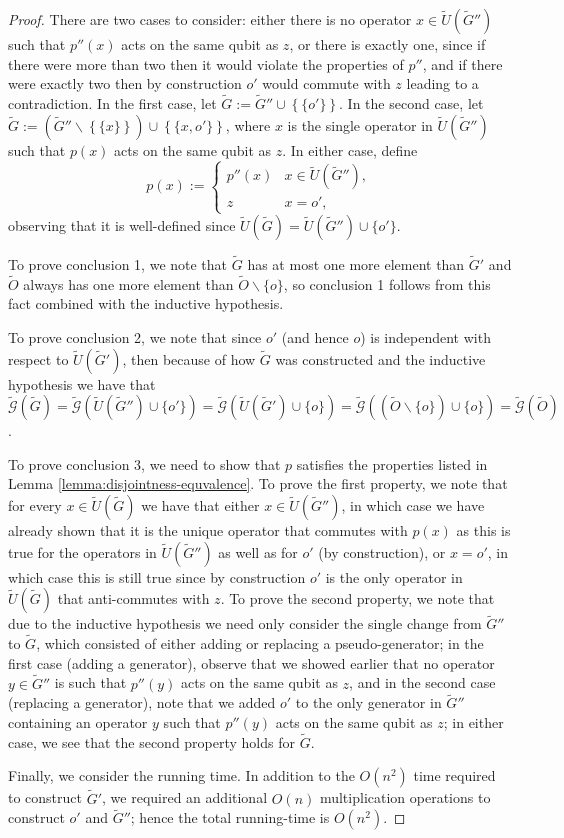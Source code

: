\documentclass{amsbook}
\theoremstyle{plain}
\theoremstyle{definition}
\theoremstyle{remark}
\newcommand{\set}{\tilde}
\newcommand{\genfun}{\tilde{\mathcal{G}}}
\newcommand{\paren}[1]{\left(#1\right)}
\begin{document}
\begin{proof}
There are two cases to consider:  either there is no operator $x\in\set U(\set G'')$ such that $p''(x)$ acts on the same qubit as $z$, or there is exactly one, since if there were more than two then it would violate the properties of $p''$, and if there were exactly two then by construction $o'$ would commute with $z$ leading to a contradiction.  In the first case, let $\set G:=\set G''\cup\left\{\{o'\}\right\}$.  In the second case, let $\set G:=\paren{\set G''\backslash\left\{\{x\}\right\}}\cup\left\{\{x,o'\}\right\}$, where $x$ is the single operator in $\set U(\set G'')$ such that $p(x)$ acts on the same qubit as $z$.   In either case, define
$$
p(x) :=
\begin{cases}
p''(x) & x\in \set U(\set G''), \\
z & x=o',
\end{cases}
$$
observing that it is well-defined since $\set U(\set G)=\set U(\set G'')\cup\{o'\}$.

To prove conclusion 1, we note that $\set G$ has at most one more element than $\set G'$ and $\set O$ always has one more element than $\set O\backslash\{o\}$, so conclusion 1 follows from this fact combined with the inductive hypothesis.

To prove conclusion 2, we note that since $o'$ (and hence $o$) is independent with respect to $\set U(\set G')$, then because of how $\set G$ was constructed and the inductive hypothesis we have that $\genfun(\set G)=\genfun\paren{\set U(\set G'')\cup\{o'\}}=\genfun\paren{\set U(\set G')\cup\{o\}}=\genfun\paren{(\set O\backslash\{o\})\cup\{o\}}=\genfun(\set O)$.

To prove conclusion 3, we need to show that $p$ satisfies the properties listed in Lemma \ref{lemma:disjointness-equvalence}.  To prove the first property, we note that for every $x\in\set U(\set G)$ we have that either $x\in\set U(\set G'')$, in which case we have already shown that it is the unique operator that commutes with $p(x)$ as this is true for the operators in $\set U(\set G'')$ as well as for $o'$ (by construction), or $x=o'$, in which case this is still true since by construction $o'$ is the only operator in $\set U(\set G)$ that anti-commutes with $z$.  To prove the second property, we note that due to the inductive hypothesis we need only consider the single change from $\set G''$ to $\set G$, which consisted of either adding or replacing a pseudo-generator;  in the first case (adding a generator), observe that we showed earlier that no operator $y\in\set G''$ is such that $p''(y)$ acts on the same qubit as $z$, and in the second case (replacing a generator), note that we added $o'$ to the only generator in $\set G''$ containing an operator $y$ such that $p''(y)$ acts on the same qubit as $z$;  in either case, we see that the second property holds for $\set G$.

Finally, we consider the running time.  In addition to the $O(n^2)$ time required to construct $\set G'$, we required an additional $O(n)$ multiplication operations to construct $o'$ and $\set G''$;  hence the total running-time is $O(n^2)$.
\end{proof}
\end{document}
